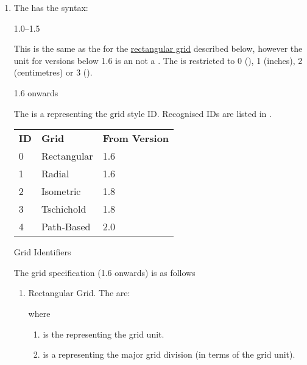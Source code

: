 \begin{numbered}
\begin{enumerate}
  \item The  has the syntax:
  \begin{jdrversion}{1.0--1.5}
  \begin{syntaxline}
    
  \end{syntaxline}
  This is the same as the 
  for the \hyperref[jdr:rectgrid]{rectangular grid} described below, 
  however the  unit for versions below 1.6 is an  not a
  . The  is restricted to
  0 (), 1 (inches),
  2 (centimetres) or 3 ().
  \end{jdrversion}
  \begin{jdrversion}{1.6 onwards}
  \begin{syntaxline}
   
  \end{syntaxline}
  The  is a  representing the grid style ID.
  Recognised IDs are listed in .
  \end{jdrversion}

{%
 \begin{tabular}{lll}
  \bfseries ID & \bfseries Grid & \bfseries From Version\\
  0 & Rectangular & 1.6\\
  1 & Radial & 1.6 \\
  2 & Isometric & 1.8\\
  3 & Tschichold & 1.8\\
  4 & Path-Based & 2.0
 \end{tabular}
}
{Grid Identifiers}

  The grid specification (1.6 onwards) is as follows

    \begin{enumerate}
    \item\label{jdr:rectgrid} Rectangular Grid. The  are:
    \begin{syntaxline}
      
    \end{syntaxline}
    where
     \begin{enumerate}
     \item {} is the  representing the grid unit.

       \item {} is a  representing the major
        grid division (in terms of the grid unit).


\end{enumerate}
\end{enumerate}
\end{enumerate}
\end{numbered}
